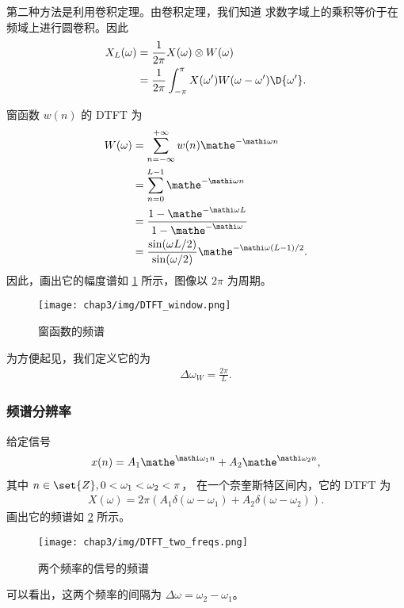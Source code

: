 \begin{example}
    第二种方法是利用卷积定理。由卷积定理，我们知道
    求数字域上的乘积等价于在频域上进行圆卷积。因此
    \begin{align*}
        X_L(\omega) & = \frac{1}{2\pi}X(\omega) \otimes W(\omega) \\
        & = \frac{1}{2\pi}\int_{-\pi}^{\pi}X(\omega')W(\omega - \omega')\D{\omega'}.
    \end{align*}
\end{example}

\begin{example}[窗函数的频谱与主瓣宽度]
    窗函数 $w(n)$ 的 DTFT 为
    \begin{align*}
        W(\omega) & = \sum_{n = -\infty}^{+\infty}w(n) \mathe^{-\mathi\omega n} \\
        & = \sum_{n = 0}^{L-1}\mathe^{-\mathi\omega n} \\
        & = \frac{1 - \mathe^{-\mathi\omega L}}{1 - \mathe^{-\mathi\omega}} \\
        & = \frac{\sin(\omega L/2)}{\sin(\omega/2)}\mathe^{-\mathi\omega(L-1)/2}.
    \end{align*}
    因此，画出它的幅度谱如 \ref{fig:DTFT-window.png} 所示，图像以 $2\pi$ 为周期。
    \begin{figure}[H]
        \centering
        \texttt{[image: chap3/img/DTFT\_window.png]}
        \caption{窗函数的频谱}
        \label{fig:DTFT-window.png}
    \end{figure}
    为方便起见，我们定义它的为
    \begin{align*}
        \Delta\omega_W = \frac{2\pi}{L}.
    \end{align*}
\end{example}

\subsubsection{频谱分辨率}

\begin{example}
    给定信号
    \begin{align*}
        x(n) = A_1\mathe^{\mathi\omega_1 n} + A_2\mathe^{\mathi\omega_2 n},
    \end{align*}
    其中 $n \in \set{Z}, 0 < \omega_1 < \omega_2 < \pi$，
    在一个奈奎斯特区间内，它的 DTFT 为
    \begin{align*}
        X(\omega) = 2\pi(A_1\delta(\omega - \omega_1) + A_2\delta(\omega - \omega_2)).
    \end{align*}
    画出它的频谱如 \ref{fig:DTFT-two-freqs.png} 所示。
    \begin{figure}[H]
        \centering
        \texttt{[image: chap3/img/DTFT\_two\_freqs.png]}
        \caption{两个频率的信号的频谱}
        \label{fig:DTFT-two-freqs.png}
    \end{figure}
    可以看出，这两个频率的间隔为 $\Delta\omega = \omega_2 - \omega_1$。
\end{example}


